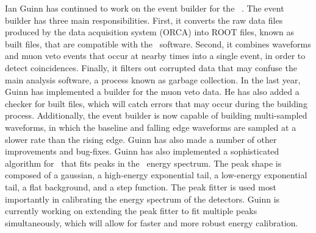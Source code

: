 Ian Guinn has continued to work on the event builder for the \MJ\ \MJDemo. The event builder has three main responsibilities. First, it converts the raw data files produced by the data acquisition system (ORCA) into ROOT files, known as built files, that are compatible with the \MJ\ software. Second, it combines waveforms and muon veto events that occur at nearby times into a single event, in order to detect coincidences. Finally, it filters out corrupted data that may confuse the main analysis software, a process known as garbage collection. In the last year, Guinn has implemented a builder for the muon veto data. He has also added a checker for built files, which will catch errors that may occur during the building process. Additionally, the event builder is now capable of building multi-sampled waveforms, in which the baseline and falling edge waveforms are sampled at a slower rate than the rising edge. Guinn has also made a number of other improvements and bug-fixes.\newline
\indent Guinn has also implemented a sophisticated algorithm for \MJ\ that fits peaks in the \MJDemo\ energy spectrum. The peak shape is composed of a gaussian, a high-energy exponential tail, a low-energy exponential tail, a flat background, and a step function. The peak fitter is used most importantly in calibrating the energy spectrum of the detectors. Guinn is currently working on extending the peak fitter to fit multiple peaks simultaneously, which will allow for faster and more robust energy calibration.

